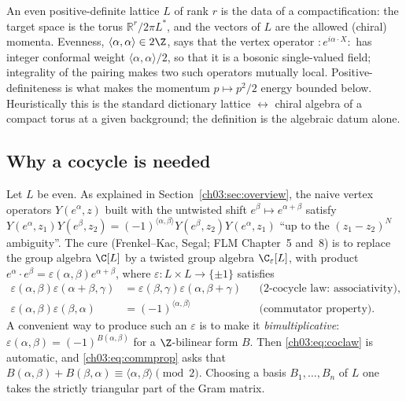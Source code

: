 \begin{physics}
An even positive-definite lattice $L$ of rank $r$ is the data of a compactification: the target space is the torus $\mathbb R^r/2\pi L^*$, and the vectors of $L$ are the allowed (chiral) momenta. Evenness, $\langle\alpha,\alpha\rangle\in2\Z$, says that the vertex operator $:\!e^{i\alpha\cdot X}\!:$ has integer conformal weight $\langle\alpha,\alpha\rangle/2$, so that it is a bosonic single-valued field; integrality of the pairing makes two such operators mutually local. Positive-definiteness is what makes the momentum $p\mapsto p^2/2$ energy bounded below. Heuristically this is the standard dictionary lattice $\leftrightarrow$ chiral algebra of a compact torus at a given background; the definition is the algebraic datum alone.
\end{physics}

\subsection{Why a cocycle is needed}

Let $L$ be even. As explained in Section~\ref{ch03:sec:overview}, the naive vertex operators
$Y(e^\alpha,z)$ built with the untwisted shift $e^\beta\mapsto e^{\alpha+\beta}$ satisfy
$Y(e^\alpha,z_1)Y(e^\beta,z_2)=(-1)^{\langle\alpha,\beta\rangle}Y(e^\beta,z_2)Y(e^\alpha,z_1)$
``up to the $(z_1-z_2)^N$ ambiguity''. The cure (Frenkel--Kac, Segal; FLM Chapter~5 and~8) is to
replace the group algebra $\C[L]$ by a twisted group algebra $\C_\varepsilon[L]$, with product
$e^\alpha\cdot e^\beta=\varepsilon(\alpha,\beta)e^{\alpha+\beta}$, where
$\varepsilon\colon L\times L\to\{\pm1\}$ satisfies
\begin{align}
  \varepsilon(\alpha,\beta)\varepsilon(\alpha+\beta,\gamma)&=\varepsilon(\beta,\gamma)
    \varepsilon(\alpha,\beta+\gamma) &&\text{(2-cocycle law: associativity)},\label{ch03:eq:coclaw}\\
  \varepsilon(\alpha,\beta)\varepsilon(\beta,\alpha)&=(-1)^{\langle\alpha,\beta\rangle}
  &&\text{(commutator property)}.\label{ch03:eq:commprop}
\end{align}
A convenient way to produce such an $\varepsilon$ is to make it \emph{bimultiplicative}:
$\varepsilon(\alpha,\beta)=(-1)^{B(\alpha,\beta)}$ for a $\Z$-bilinear form $B$. Then
\eqref{ch03:eq:coclaw} is automatic, and \eqref{ch03:eq:commprop} asks that
$B(\alpha,\beta)+B(\beta,\alpha)\equiv\langle\alpha,\beta\rangle\pmod 2$. Choosing a basis
$B_1,\dots,B_n$ of $L$ one takes the strictly triangular part of the Gram matrix.

